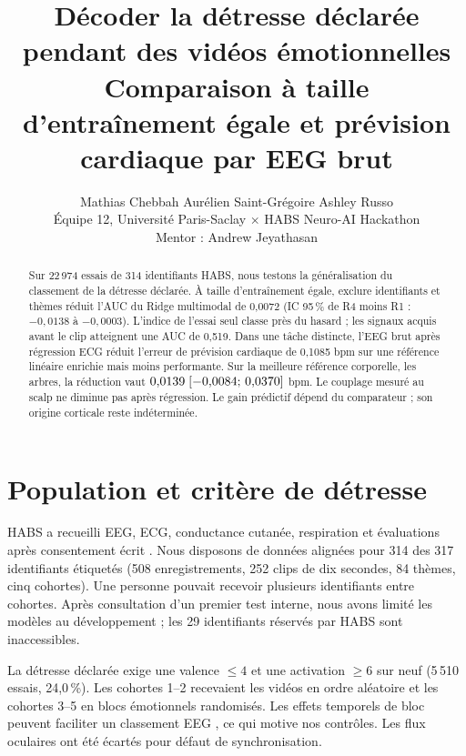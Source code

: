 \documentclass[10pt,a4paper]{article}
\title{\vspace{-2em}\Large\bfseries\color{ink} Décoder la détresse déclarée pendant des vidéos émotionnelles\\[2pt]\large Comparaison à taille d’entraînement égale et prévision cardiaque par EEG brut}
\author{\normalsize Mathias Chebbah \quad Aurélien Saint-Grégoire \quad Ashley Russo\\\small Équipe 12, Université Paris-Saclay $\times$ HABS Neuro-AI Hackathon\\\small Mentor : Andrew Jeyathasan}
\date{}
\begin{document}
\maketitle\vspace{-1.5em}
\begin{abstract}\noindent
Sur 22\,974 essais de 314 identifiants HABS, nous testons la généralisation du classement de la détresse déclarée. À taille d’entraînement égale, exclure identifiants et thèmes réduit l’AUC du Ridge multimodal de 0,0072 (IC 95\,\% de R4 moins R1 : $-0{,}0138$ à $-0{,}0003$). L’indice de l’essai seul classe près du hasard ; les signaux acquis avant le clip atteignent une AUC de 0,519. Dans une tâche distincte, l’EEG brut après régression ECG réduit l’erreur de prévision cardiaque de 0,1085 bpm sur une référence linéaire enrichie mais moins performante. Sur la meilleure référence corporelle, les arbres, la réduction vaut $0{,}0139\;[-0{,}0084;\,0{,}0370]$ bpm. Le couplage mesuré au scalp ne diminue pas après régression. Le gain prédictif dépend du comparateur ; son origine corticale reste indéterminée.
\end{abstract}
\section{Population et critère de détresse}
HABS a recueilli EEG, ECG, conductance cutanée, respiration et évaluations après consentement écrit \cite{habs}. Nous disposons de données alignées pour 314 des 317 identifiants étiquetés (508 enregistrements, 252 clips de dix secondes, 84 thèmes, cinq cohortes). Une personne pouvait recevoir plusieurs identifiants entre cohortes. Après consultation d’un premier test interne, nous avons limité les modèles au développement ; les 29 identifiants réservés par HABS sont inaccessibles.

La détresse déclarée exige une valence $\le4$ et une activation $\ge6$ sur neuf (5\,510 essais, 24,0\,\%). Les cohortes 1--2 recevaient les vidéos en ordre aléatoire et les cohortes 3--5 en blocs émotionnels randomisés. Les effets temporels de bloc peuvent faciliter un classement EEG \cite{li}, ce qui motive nos contrôles. Les flux oculaires ont été écartés pour défaut de synchronisation.
\end{document}
